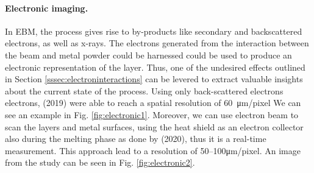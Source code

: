 \paragraph{Electronic imaging.} In EBM, the process gives rise to by-products like secondary and backscattered electrons, as well as x-rays. The electrons generated from the interaction between the beam and metal powder could be harnessed could be used to produce an electronic representation of the layer. Thus, one of the undesired effects outlined in Section \ref{sssec:electroninteractions} can be levered to extract valuable insights about the current state of the process. Using only back-scattered electrons electrons, \citeauthor{wong_pilot_2019} (2019) were able to reach a spatial resolution of \SI{60}{\micro\metre / pixel} We can see an example in Fig. \ref{fig:electronic1}. Moreover, we can use electron beam to scan the layers and metal surfaces, using the heat shield as an electron collector also during the melting phase as done by \citeauthor{arnold_operando_2020} (2020), thus it is a real-time measurement. This approach lead to a resolution of \numrange[range-phrase=--]{50}{100}\unit{\micro\metre / pixel}. An image from the study can be seen in Fig. \ref{fig:electronic2}.
